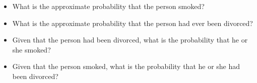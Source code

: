 \documentclass[
]{report}
\providecommand{\tightlist}{%
  \setlength{\itemsep}{0pt}\setlength{\parskip}{0pt}}
\begin{document}
\begin{itemize}
\tightlist
\item
  What is the approximate probability that the person smoked?
\end{itemize}

\vspace{0.5in}

\begin{itemize}
\tightlist
\item
  What is the approximate probability that the person had ever been divorced?
\end{itemize}

\vspace{0.5in}

\begin{itemize}
\tightlist
\item
  Given that the person had been divorced, what is the probability that he or she smoked?
\end{itemize}

\vspace{0.5in}

\begin{itemize}
\tightlist
\item
  Given that the person smoked, what is the probability that he or she had been divorced?
\end{itemize}

\vspace{0.5in}

\end{document}
